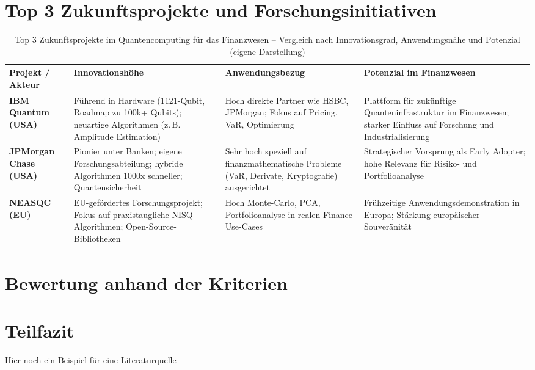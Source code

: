 \section{Top 3 Zukunftsprojekte und Forschungsinitiativen}

\vspace{0.5em}
\begin{table}[h]
\centering
\renewcommand{\arraystretch}{1.3}
\begin{tabular}{|p{3.5cm}|p{3.5cm}|p{3cm}|p{4.5cm}|}
\hline
\textbf{Projekt / Akteur} & \textbf{Innovationshöhe} & \textbf{Anwendungsbezug} & \textbf{Potenzial im Finanzwesen} \\
\hline
\textbf{IBM Quantum (USA)} & Führend in Hardware (1121-Qubit, Roadmap zu 100k+ Qubits); neuartige Algorithmen (z.\,B. Amplitude Estimation) & Hoch   direkte Partner wie HSBC, JPMorgan; Fokus auf Pricing, VaR, Optimierung & Plattform für zukünftige Quanteninfrastruktur im Finanzwesen; starker Einfluss auf Forschung und Industrialisierung \\
\hline
\textbf{JPMorgan Chase (USA)} & Pionier unter Banken; eigene Forschungsabteilung; hybride Algorithmen 1000x schneller; Quantensicherheit & Sehr hoch   speziell auf finanzmathematische Probleme (VaR, Derivate, Kryptografie) ausgerichtet & Strategischer Vorsprung als Early Adopter; hohe Relevanz für Risiko- und Portfolioanalyse \\
\hline
\textbf{NEASQC (EU)} & EU-gefördertes Forschungsprojekt; Fokus auf praxistaugliche NISQ-Algorithmen; Open-Source-Bibliotheken & Hoch   Monte-Carlo, PCA, Portfolioanalyse in realen Finance-Use-Cases & Frühzeitige Anwendungsdemonstration in Europa; Stärkung europäischer Souveränität \\
\hline
\end{tabular}
\caption{Top 3 Zukunftsprojekte im Quantencomputing für das Finanzwesen – Vergleich nach Innovationsgrad, Anwendungsnähe und Potenzial (eigene Darstellung)}
\end{table}


\section{Bewertung anhand der Kriterien}

\section{Teilfazit}

Hier noch ein Beispiel für eine Literaturquelle 


\cite{feri_cognitive_finance_institute_quantenzeitalter_2024}

\printbibliography



